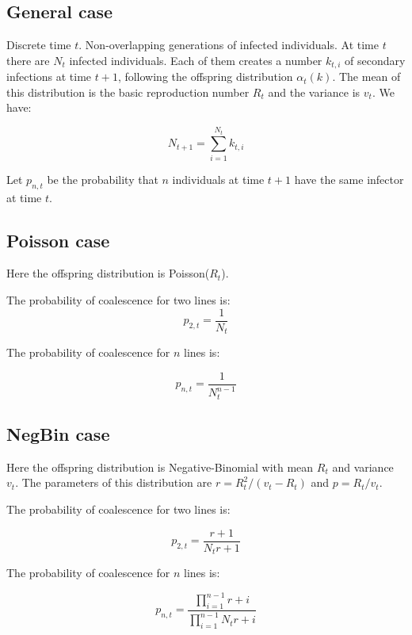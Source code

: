 \documentclass{article}
\begin{document}
\subsection{General case}

Discrete time $t$. Non-overlapping generations of infected individuals. At time $t$ there are $N_t$ infected individuals. Each of them creates a number $k_{t,i}$ of secondary infections at time $t+1$, following the offspring distribution $\alpha_t(k)$. The mean of this distribution is the basic reproduction number $R_t$ and the variance is $v_t$. We have:

\begin{equation}
N_{t+1}=\sum_{i=1}^{N_t} k_{t,i}
\label{eq:summation}
\end{equation}

Let $p_{n,t}$ be the probability that $n$ individuals at time $t+1$ have the same infector at time $t$.

\subsection{Poisson case}

Here the offspring distribution is Poisson($R_t$).

The probability of coalescence for two lines is:
\begin{equation}
p_{2,t}=\frac{1}{N_t}
\end{equation}

The probability of coalescence for $n$ lines is:

\begin{equation}
p_{n,t}=\frac{1}{N_t^{n-1}}
\end{equation}

\subsection{NegBin case}

Here the offspring distribution is Negative-Binomial with mean $R_t$ and variance $v_t$.
The parameters of this distribution are 
$r=R_t^2/(v_t-R_t)$ and $p=R_t/v_t$.

The probability of coalescence for two lines is:

\begin{equation}
p_{2,t}=\frac{r+1}{N_t r+1}
\end{equation}

The probability of coalescence for $n$ lines is:

\begin{equation}
p_{n,t}=\frac{\prod_{i=1}^{n-1}r+i}{\prod_{i=1}^{n-1}N_t r+i}
\end{equation}
\end{document}
